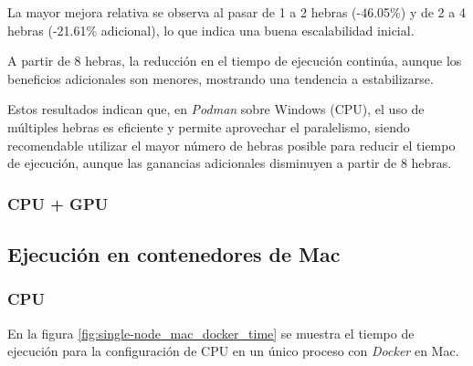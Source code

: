 La mayor mejora relativa se observa al pasar de 1 a 2 hebras (-46.05\%) y de 2 a 4 hebras (-21.61\% adicional), lo que indica una buena escalabilidad inicial.

A partir de 8 hebras, la reducción en el tiempo de ejecución continúa, aunque los beneficios adicionales son menores, mostrando una tendencia a estabilizarse.

Estos resultados indican que, en \textit{Podman} sobre Windows (CPU), el uso de múltiples hebras es eficiente y permite aprovechar el paralelismo, siendo recomendable utilizar el mayor número de hebras posible para reducir el tiempo de ejecución, aunque las ganancias adicionales disminuyen a partir de 8 hebras.

\subsubsection{CPU + GPU}




\subsection{Ejecución en contenedores de Mac}
\subsubsection{CPU}

En la figura \ref{fig:single-node_mac_docker_time} se muestra el tiempo de ejecución para la configuración de CPU en un único proceso con \textit{Docker} en Mac.

